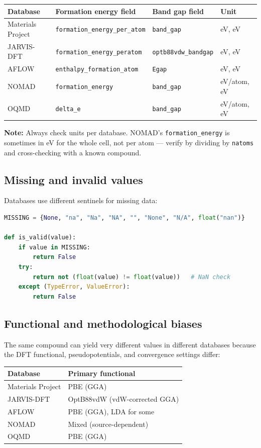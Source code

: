\documentclass[11pt,a4paper]{article}
\begin{document}
\begin{center}
\begin{tabular}{llll}
\toprule
Database & Formation energy field & Band gap field & Unit \\
\midrule
Materials Project & \texttt{formation\_energy\_per\_atom} & \texttt{band\_gap} & eV, eV \\
JARVIS-DFT        & \texttt{formation\_energy\_peratom}  & \texttt{optb88vdw\_bandgap} & eV, eV \\
AFLOW             & \texttt{enthalpy\_formation\_atom}   & \texttt{Egap} & eV, eV \\
NOMAD             & \texttt{formation\_energy}           & \texttt{band\_gap} & eV/atom, eV \\
OQMD              & \texttt{delta\_e}                    & \texttt{band\_gap} & eV/atom, eV \\
\bottomrule
\end{tabular}
\end{center}

\noindent\textbf{Note:} Always check units per database.
NOMAD's \texttt{formation\_energy} is sometimes in eV for the whole cell, not per atom
--- verify by dividing by \texttt{natoms} and cross-checking with a known compound.

\subsection{Missing and invalid values}
Databases use different sentinels for missing data:
\begin{lstlisting}[language=Python]
MISSING = {None, "na", "Na", "NA", "", "None", "N/A", float("nan")}

def is_valid(value):
    if value in MISSING:
        return False
    try:
        return not (float(value) != float(value))   # NaN check
    except (TypeError, ValueError):
        return False
\end{lstlisting}

\subsection{Functional and methodological biases}
The same compound can yield very different values in different databases because the
DFT functional, pseudopotentials, and convergence settings differ:

\begin{center}
\begin{tabular}{ll}
\toprule
Database & Primary functional \\
\midrule
Materials Project & PBE (GGA) \\
JARVIS-DFT        & OptB88vdW (vdW-corrected GGA) \\
AFLOW             & PBE (GGA), LDA for some \\
NOMAD             & Mixed (source-dependent) \\
OQMD              & PBE (GGA) \\
\bottomrule
\end{tabular}
\end{center}
\end{document}
